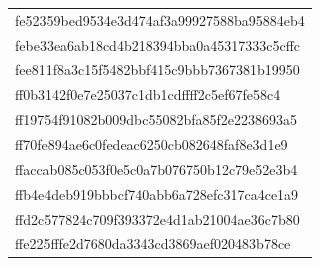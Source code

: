 \begin{tabular}{l}
fe52359bed9534e3d474af3a99927588ba95884eb4 \\
febe33ea6ab18cd4b218394bba0a45317333c5cffc \\
fee811f8a3c15f5482bbf415c9bbb7367381b19950 \\
ff0b3142f0e7e25037c1db1cdffff2c5ef67fe58c4 \\
ff19754f91082b009dbc55082bfa85f2e2238693a5 \\
ff70fe894ae6c0fedeac6250cb082648faf8e3d1e9 \\
ffaccab085c053f0e5c0a7b076750b12c79e52e3b4 \\
ffb4e4deb919bbbcf740abb6a728efc317ca4ce1a9 \\
ffd2c577824c709f393372e4d1ab21004ae36c7b80 \\
ffe225fffe2d7680da3343cd3869aef020483b78ce \\
\bottomrule
\end{tabular}
